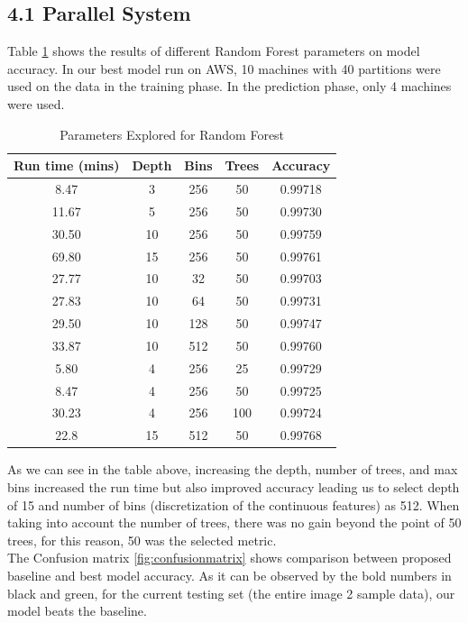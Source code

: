 \documentclass{neu_handout}
\begin{document}
\subsection*{4.1 Parallel System}
Table \ref{tab:parameters-runtime} shows the results of different Random Forest parameters on model accuracy. In our best model run on AWS, 10 machines with 40 partitions were used on the data in the training phase. In the prediction phase, only 4 machines were used.

\begin{table}[h!]
\centering
 \begin{tabular}{||c c c c c||} 
 \hline
Run time (mins) & Depth & Bins & Trees & Accuracy \\ [0.5ex] 
 \hline\hline
8.47  & 3  & 256 & 50 & 0.99718 \\
11.67 & 5  & 256 & 50 & 0.99730 \\
30.50 & 10 & 256 & 50 & 0.99759 \\
69.80 & 15 & 256 & 50 & 0.99761 \\
 \hline
27.77 & 10 & 32  & 50 & 0.99703 \\
27.83 & 10 & 64  & 50 & 0.99731 \\
29.50 & 10 & 128 & 50 & 0.99747 \\
33.87 & 10 & 512 & 50 & 0.99760 \\ 
 \hline 
5.80  & 4 & 256 & 25  & 0.99729 \\
8.47  & 4 & 256 & 50  & 0.99725 \\
30.23 & 4 & 256 & 100 & 0.99724 \\
\hline
\hline
22.8 	& 15  & 512 & 50 & 0.99768 \\[1ex] 
 \hline
 \end{tabular}
 \caption{Parameters Explored for Random Forest} \label{tab:parameters-runtime}
\end{table}

As we can see in the table above, increasing the depth, number of trees, and max bins increased the run time but also improved accuracy leading us to select depth of 15 and number of bins (discretization of the continuous features) as 512. When taking into account the number of trees, there was no gain beyond the point of 50 trees, for this reason, 50 was the selected metric.\\

The Confusion matrix \ref{fig:confusionmatrix} shows comparison between proposed baseline and best model accuracy. As it can be observed by the bold numbers in black and green, for the current testing set (the entire image 2 sample data), our model beats the baseline.
\end{document}
